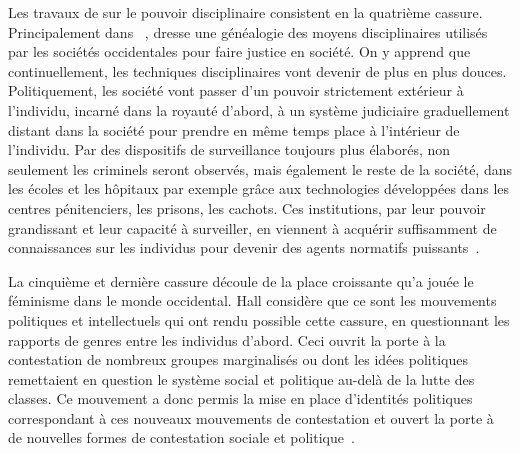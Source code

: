 Les travaux de \citeauthor{Foucault2004a} sur le pouvoir disciplinaire consistent en la quatrième cassure. 
Principalement dans ~\citeyearpar{Foucault2004a}, \citeauthor{Foucault2004a} dresse une généalogie des moyens disciplinaires utilisés par les sociétés occidentales pour faire justice en société. 
On y apprend que continuellement, les techniques disciplinaires vont devenir de plus en plus douces.
Politiquement, les société vont passer d'un pouvoir strictement extérieur à l'individu, incarné dans la royauté d'abord, à un système judiciaire graduellement distant dans la société pour prendre en même temps place à l'intérieur de l'individu. 
Par des dispositifs de surveillance toujours plus élaborés, non seulement les criminels seront observés, mais également le reste de la société, dans les écoles et les hôpitaux par exemple grâce aux technologies développées dans les centres pénitenciers, les prisons, les cachots. 
Ces institutions, par leur pouvoir grandissant et leur capacité à surveiller, en viennent à acquérir suffisamment de connaissances sur les individus pour devenir des agents normatifs puissants~\citep[608--609]{Hall1996a}.

La cinquième et dernière cassure découle de la place croissante qu'a jouée le féminisme dans le monde occidental. 
Hall considère que ce sont les mouvements politiques et intellectuels qui ont rendu possible cette cassure, en questionnant les rapports de genres entre les individus d'abord. 
Ceci ouvrit la porte à la contestation de nombreux groupes marginalisés ou dont les idées politiques remettaient en question le système social et politique au-delà de la lutte des classes. 
Ce mouvement a donc permis la mise en place d'identités politiques correspondant à ces nouveaux mouvements de contestation et ouvert la porte à de nouvelles formes de contestation sociale et politique~\citeyearpar[610]{Hall1996a}.

